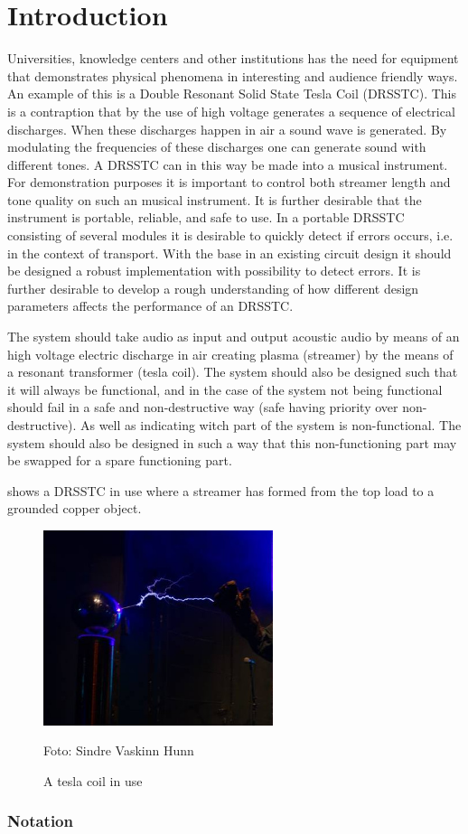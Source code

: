 \chapter{Introduction}
\label{intro}
Universities, knowledge centers and other institutions has the need for equipment that demonstrates physical phenomena in interesting and audience friendly ways. An example of this is a Double Resonant Solid State Tesla Coil (DRSSTC). This is a contraption that by the use of high voltage generates a sequence of electrical discharges. When these discharges happen in air a sound wave is generated. By modulating the frequencies of these discharges one can generate sound with different tones. A DRSSTC can in this way be made into a musical instrument.
For demonstration purposes it is important to control both streamer length and tone quality on such an musical instrument. It is further desirable that the instrument is portable, reliable, and safe to use.
In a portable DRSSTC consisting of several modules it is desirable to quickly detect if errors occurs, i.e. in the context of transport. With the base in an existing circuit design it should be designed a robust implementation with possibility to detect errors. It is further desirable to develop a rough understanding of how different design parameters affects the performance of an DRSSTC.

The system should take audio as input and output acoustic audio by means of an high voltage electric discharge in air creating plasma (streamer) by the means of a resonant transformer (tesla coil). The system should also be designed such that it will always be functional, and in the case of the system not being functional should fail in a safe and non-destructive way (safe having priority over non-destructive). As well as indicating witch part of the system is non-functional. The system should also be designed in such a way that this non-functioning part may be swapped for a spare functioning part.

 shows a DRSSTC in use where a streamer has formed from the top load to a grounded copper object.

\begin{figure}[ht]
    \centering
    \includegraphics[width=0.6\textwidth]{img/teslabano.jpg}
    \caption{A tesla coil in use}
    Foto: Sindre Vaskinn Hunn
    \label{fig:teslabano}
\end{figure}

\subsection{Notation}

